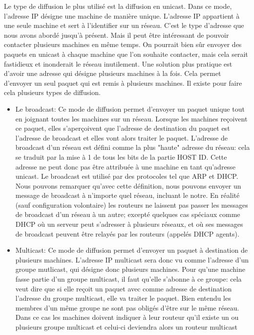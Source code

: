 Le type de diffusion le plus utilisé est la diffusion en unicast. Dans ce mode,
l'adresse IP désigne une machine de manière unique. L'adresse IP appartient
à une seule machine et sert à l'identifier sur un réseau.  C'est le type
d'adresse que nous avons abordé jusqu'à présent.  Mais il peut être intéressant
de pouvoir contacter plusieurs machines en même temps. On pourrait bien sûr
envoyer des paquets en unicast à chaque machine que l'on souhaite contacter,
mais cela serait fastidieux et inonderait le réseau inutilement. Une solution plus
pratique est d'avoir une adresse qui désigne plusieurs machines à la fois. Cela
permet d'envoyer un seul paquet qui est remis à plusieurs machines. Il
existe pour faire cela plusieurs types de diffusion.
\begin{itemize}
\item Le broadcast: Ce mode de diffusion permet d'envoyer un paquet unique tout en 
joignant toutes les machines sur un réseau. Lorsque les machines reçoivent ce
paquet, elles s'aperçoivent que l'adresse de destination du paquet est l'adresse de
broadcast et elles vont alors traiter le paquet. L'adresse de broadcast d'un réseau
est défini comme la plus "haute" adresse du réseau: cela se traduit par la mise
à 1 de tous les bits de la partie HOST ID. Cette adresse ne peut donc pas être
attribuée à une machine en tant qu'adresse unicast.  Le broadcast est utilisé
par des protocoles tel que ARP et DHCP.  Nous pouvons remarquer qu'avec cette
définition, nous pouvons envoyer un message de broadcast à n'importe quel
réseau, incluant le notre. En réalité (sauf
configuration volontaire) les routeurs ne laissent pas passer les messages de
broadcast d'un réseau à un autre; excepté quelques cas spéciaux comme DHCP où un
serveur peut s'adresser à plusieurs réseaux, et où ses messages de broadcast
peuvent être relayés par les routeurs (appelés DHCP agents).
\item Multicast: Ce mode de diffusion permet d'envoyer un paquet à destination
de plusieurs machines. L'adresse IP multicast sera donc vu comme l'adresse d'un groupe
mutlicast, qui désigne donc plusieurs machines. Pour qu'une machine fasse partie d'un
groupe multicast, il faut qu'elle s'abonne à ce groupe: cela veut dire que si elle reçoit
un paquet avec comme adresse de destination l'adresse du groupe multicast, elle va traiter
le paquet.
Bien entendu les membres d'un même groupe ne sont pas obligés d'être sur le même réseau. Dans ce
cas les machines doivent indiquer à leur routeur qu'il existe un ou plusieurs groupe multicast et celui-ci deviendra alors un routeur multicast 

\end{itemize}

